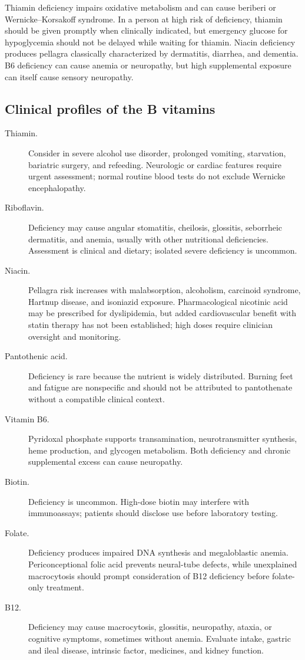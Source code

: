 Thiamin deficiency impairs oxidative metabolism and can cause beriberi or Wernicke--Korsakoff syndrome. In a person at high risk of deficiency, thiamin should be given promptly when clinically indicated, but emergency glucose for hypoglycemia should not be delayed while waiting for thiamin. Niacin deficiency produces pellagra classically characterized by dermatitis, diarrhea, and dementia. B6 deficiency can cause anemia or neuropathy, but high supplemental exposure can itself cause sensory neuropathy. \cite{odsThiamin,thiaminGlucose,odsNiacin,odsB6}

\subsection{Clinical profiles of the B vitamins}
\begin{description}
\item[Thiamin.] Consider in severe alcohol use disorder, prolonged vomiting, starvation, bariatric surgery, and refeeding. Neurologic or cardiac features require urgent assessment; normal routine blood tests do not exclude Wernicke encephalopathy. \cite{odsThiamin}
\item[Riboflavin.] Deficiency may cause angular stomatitis, cheilosis, glossitis, seborrheic dermatitis, and anemia, usually with other nutritional deficiencies. Assessment is clinical and dietary; isolated severe deficiency is uncommon. \cite{odsRiboflavin}
\item[Niacin.] Pellagra risk increases with malabsorption, alcoholism, carcinoid syndrome, Hartnup disease, and isoniazid exposure. Pharmacological nicotinic acid may be prescribed for dyslipidemia, but added cardiovascular benefit with statin therapy has not been established; high doses require clinician oversight and monitoring. \cite{odsNiacin}
\item[Pantothenic acid.] Deficiency is rare because the nutrient is widely distributed. Burning feet and fatigue are nonspecific and should not be attributed to pantothenate without a compatible clinical context. \cite{odsPantothenic}
\item[Vitamin B6.] Pyridoxal phosphate supports transamination, neurotransmitter synthesis, heme production, and glycogen metabolism. Both deficiency and chronic supplemental excess can cause neuropathy. \cite{odsB6}
\item[Biotin.] Deficiency is uncommon. High-dose biotin may interfere with immunoassays; patients should disclose use before laboratory testing. \cite{odsBiotin}
\item[Folate.] Deficiency produces impaired DNA synthesis and megaloblastic anemia. Periconceptional folic acid prevents neural-tube defects, while unexplained macrocytosis should prompt consideration of B12 deficiency before folate-only treatment. \cite{odsFolate}
\item[B12.] Deficiency may cause macrocytosis, glossitis, neuropathy, ataxia, or cognitive symptoms, sometimes without anemia. Evaluate intake, gastric and ileal disease, intrinsic factor, medicines, and kidney function. \cite{odsB12}
\end{description}

